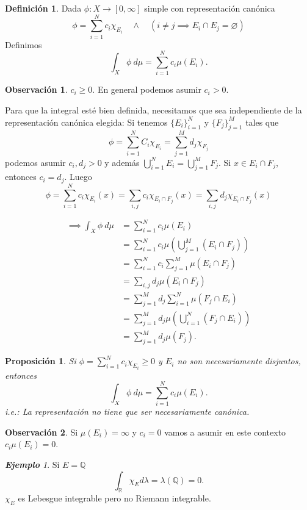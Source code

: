\documentclass{article}
\newtheorem{proposition}[theorem]{Proposición}
\theoremstyle{definition}
\newtheorem{definition}[theorem]{Definición}
\newtheorem*{obs}{Observación}
\theoremstyle{remark}
\newtheorem{example}[theorem]{\textbf{Ejemplo}}
\numberwithin{equation}{section}
\newcommand{\Q}{\mathbb{Q}}
\newcommand{\R}{\mathbb{R}}
\newcommand{\lam}{\lambda}
\newcommand{\oo}{\infty}
\newcommand{\br}[1]{\left( #1 \right)}
\newcommand{\ds}{\displaystyle}
\begin{document}
\begin{definition}
  Dada $\phi \colon X \to [0,\oo]$ simple con representación canónica 
  \[ \phi = \sum_{i=1}^N c_i \chi_{E_i} \quad\land\quad (i \neq j \implies E_i \cap E_j = \varnothing) \]
  Definimos 
  \[ \int_X \phi \ d\mu = \sum_{i=1}^N c_i \mu(E_i). \]
\end{definition}

\begin{obs}
  $c_i \geq 0$. En general podemos asumir $c_i > 0$.
\end{obs}

Para que la integral esté bien definida, necesitamos que sea independiente de la representación canónica elegida:
Si tenemos $\{E_i\}_{i=1}^N$ y $\{F_j\}_{j=1}^M$ tales que 
\[ \phi = \sum_{i=1}^N C_i \chi_{E_i} = \sum_{j=1}^M d_j \chi_{F_j} \]
podemos asumir $c_i, d_j > 0$ y además $\bigcup_{i=1}^N E_i = \bigcup_{j=1}^M F_j$.
Si $x \in E_i \cap F_j$, entonces $c_i = d_j$. Luego 
\[ \phi = \sum_{i=1}^N c_i \chi_{E_i}(x) = \sum_{i,j} c_i \chi_{E_i \cap F_j}(x) = \sum_{i,j} d_j \chi_{E_i \cap F_j}(x) \]

\begin{align*}
    \implies \int_X \phi \ d\mu
    &= \sum_{i=1}^N c_i \mu(E_i) \\
    &= \sum_{i=1}^N c_i \mu\br{\bigcup_{j=1}^M (E_i \cap F_j)} \\
    &= \sum_{i=1}^N c_i \sum_{j=1}^M \mu(E_i \cap F_j) \\
    &= \sum_{i,j} d_j \mu(E_i \cap F_j) \\
    &= \sum_{j=1}^M d_j \sum_{i=1}^N \mu(F_j \cap E_i) \\
    &= \sum_{j=1}^M d_j \mu\br{\bigcup_{i=1}^N (F_j \cap E_i)} \\
    &= \sum_{j=1}^M d_j \mu(F_j).
\end{align*}

\begin{proposition}
  Si $\ds \phi = \sum_{i=1}^N c_i \chi_{E_i} \geq 0$ y $E_i$ no son necesariamente disjuntos, entonces 
  \[ \int_X \phi \ d\mu = \sum_{i=1}^N c_i \mu(E_i). \]
  i.e.: La representación no tiene que ser necesariamente canónica.
\end{proposition}

\begin{obs}
  Si $\mu(E_i) = \oo$ y $c_i = 0$ vamos a asumir en este contexto $c_i \mu(E_i) = 0$.
\end{obs}

\begin{example}
  Si $E = \Q$ 
  \[ \int_\R \chi_E d\lam = \lam(\Q) = 0. \]
  $\chi_E$ es Lebesgue integrable pero no Riemann integrable.
\end{example}
\end{document}
